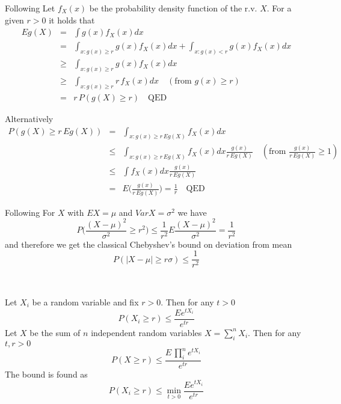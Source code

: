 \begin{prf} Following \cite{Casella2002}
Let $f_X(x)$ be the probability density function of the r.v. $X$.  For a given $r > 0$ it holds that 
\begin{eqnarray*}
E g(X) & = & \int g(x) f_X(x) dx \\
& = & \int_{x: g(x) \geq r} g(x) f_X(x) dx + \int_{x: g(x) < r} g(x) f_X(x) dx \\
& \geq & \int_{x: g(x) \geq r} g(x) f_X(x) dx \\
& \geq & \int_{x: g(x) \geq r} r \, f_X(x) dx \quad (\text{from } g(x) \geq r) \\
& = & r \, P(g(X) \geq r) \quad \text{QED}
\end{eqnarray*}

Alternatively
\begin{eqnarray*}
P(g(X) \geq r \, E g(X)) & = & \int_{x: g(x) \geq r \, E g(X)} f_X(x) dx \\
& \leq & \int_{x: g(x) \geq r \, E g(X)} f_X(x) dx \frac{g(x)}{r \, E g(X)} \quad (\text{from } \frac{g(x)}{r \, E g(X)} \geq 1) \\
& \leq & \int f_X(x) dx \frac{g(x)}{r \, E g(X)} \\
& = & E \Big( \frac{g(x)}{r \, E g(X)} \Big) = \frac{1}{r} \quad \text{QED}
\end{eqnarray*}

\begin{example} Following \cite{Casella2002}
For $X$ with $EX = \mu$ and $Var X = \sigma^2$ we have
\begin{equation*}
P\Big( \frac{(X-\mu)^2}{\sigma^2} \geq r^2 \Big) \leq \frac{1}{r^2} E \frac{(X-\mu)^2}{\sigma^2} = \frac{1}{r^2}
\end{equation*}
and therefore we get the classical Chebyshev's bound on deviation from mean 
\begin{equation*}
P( |X-\mu| \geq r\sigma) \leq \frac{1}{r^2}
\end{equation*}
\end{example}
\end{prf}

\ \\

\begin{theorem}
Let $X_i$ be a random variable and fix $r > 0$. Then for any $t > 0$
\begin{equation*}
P(X_i \geq r) \leq \frac{E e^{tX_i}}{e^{tr}} 
\end{equation*}
Let $X$ be the sum of $n$ independent random variables $X = \sum_i^n X_i$. Then for any $t,r > 0$
\begin{equation*}
P(X \geq r) \leq \frac{E \, \prod_i^n e^{tX_i}}{e^{tr}} 
\end{equation*}
The bound is found as
\begin{equation*}
P(X_i \geq r) \leq \min_{t>0} \frac{E e^{tX_i}}{e^{tr}} 
\end{equation*}

\end{theorem}

